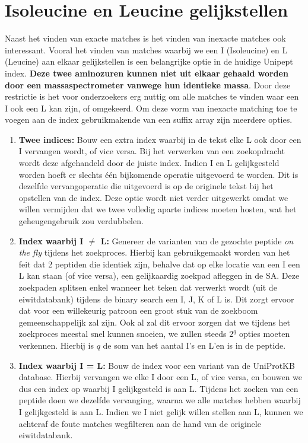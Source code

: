 \section{Isoleucine en Leucine gelijkstellen}\label{sec:isoleucine-en-leucine-equivalentie}
Naast het vinden van exacte matches is het vinden van inexacte matches ook interessant.
Vooral het vinden van matches waarbij we een I (Isoleucine) en L (Leucine) aan elkaar gelijkstellen is een belangrijke optie in de huidige Unipept index.
\textbf{Deze twee aminozuren kunnen niet uit elkaar gehaald worden door een massaspectrometer vanwege hun identieke massa}.
Door deze restrictie is het voor onderzoekers erg nuttig om alle matches te vinden waar een I ook een L kan zijn, of omgekeerd.
Om deze vorm van inexacte matching toe te voegen aan de index gebruikmakende van een suffix array zijn meerdere opties.
\begin{enumerate}
    \item \textbf{Twee indices:} Bouw een extra index waarbij in de tekst elke L ook door een I vervangen wordt, of vice versa.
    Bij het verwerken van een zoekopdracht wordt deze afgehandeld door de juiste index.
    Indien I en L gelijkgesteld worden hoeft er slechts één bijkomende operatie uitgevoerd te worden.
    Dit is dezelfde vervangoperatie die uitgevoerd is op de originele tekst bij het opstellen van de index.
    Deze optie wordt niet verder uitgewerkt omdat we willen vermijden dat we twee volledig aparte indices moeten hosten, wat het geheugengebruik zou verdubbelen.
    \item \textbf{Index waarbij I $\neq$ L:} Genereer de varianten van de gezochte peptide \textit{on the fly} tijdens het zoekproces.
    Hierbij kan gebruikgemaakt worden van het feit dat 2 peptiden die identiek zijn, behalve dat op elke locatie van een I een L kan staan (of vice versa), een gelijkaardig zoekpad afleggen in de SA\@.
    Deze zoekpaden splitsen enkel wanneer het teken dat verwerkt wordt (uit de eiwitdatabank) tijdens de binary search een I, J, K of L is.
    Dit zorgt ervoor dat voor een willekeurig patroon een groot stuk van de zoekboom gemeenschappelijk zal zijn.
    Ook al zal dit ervoor zorgen dat we tijdens het zoekproces meestal snel kunnen snoeien, we zullen steeds $2^{q}$ opties moeten verkennen.
    Hierbij is $q$ de som van het aantal I's en L'en is in de peptide.
    \item \textbf{Index waarbij I = L:} Bouw de index voor een variant van de UniProtKB database.
    Hierbij vervangen we elke I door een L, of vice versa, en bouwen we dus een index op waarbij I gelijkgesteld is aan L\@.
    Tijdens het zoeken van een peptide doen we dezelfde vervanging, waarna we alle matches hebben waarbij I gelijkgesteld is aan L\@.
    Indien we I niet gelijk willen stellen aan L, kunnen we achteraf de foute matches wegfilteren aan de hand van de originele eiwitdatabank.
\end{enumerate}

